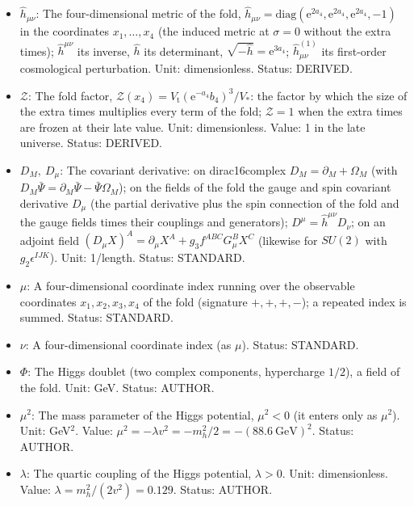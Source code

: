 \documentclass[
  10pt,
]{article}
\providecommand{\tightlist}{%
  \setlength{\itemsep}{0pt}\setlength{\parskip}{0pt}}
\begin{document}
\begin{itemize}
\tightlist
\item
  \(\hat h_{\mu\nu}\): The four-dimensional metric of the fold,
  \(\hat h_{\mu\nu} = \mathrm{diag}(\mathrm{e}^{2a_4}, \mathrm{e}^{2a_4}, \mathrm{e}^{2a_4}, -1)\)
  in the coordinates \(x_1, \dots, x_4\) (the induced metric at
  \(\sigma = 0\) without the extra times); \(\hat h^{\mu\nu}\) its
  inverse, \(\hat h\) its determinant,
  \(\sqrt{-\hat h} = \mathrm{e}^{3a_4}\); \(\hat h^{(1)}_{\mu\nu}\) its
  first-order cosmological perturbation. Unit: dimensionless. Status:
  DERIVED.
\item
  \(\mathcal{Z}\): The fold factor,
  \(\mathcal{Z}(x_4) = V_{\mathrm{t}}(\mathrm{e}^{-a_4}b_4)^3/V_*\): the
  factor by which the size of the extra times multiplies every term of
  the fold; \(\mathcal{Z} = 1\) when the extra times are frozen at their
  late value. Unit: dimensionless. Value: 1 in the late universe.
  Status: DERIVED.
\item
  \(D_M,\ D_\mu\): The covariant derivative: on dirac16complex
  \(D_M = \partial_M + \Omega_M\) (with
  \(D_M\bar\Psi = \partial_M\bar\Psi - \bar\Psi\Omega_M\)); on the
  fields of the fold the gauge and spin covariant derivative \(D_\mu\)
  (the partial derivative plus the spin connection of the fold and the
  gauge fields times their couplings and generators);
  \(D^\mu = \hat h^{\mu\nu}D_\nu\); on an adjoint field
  \((D_\mu X)^A = \partial_\mu X^A + g_3f^{ABC}G^B_\mu X^C\) (likewise
  for \(SU(2)\) with \(g_2\epsilon^{IJK}\)). Unit: 1/length. Status:
  STANDARD.
\item
  \(\mu\): A four-dimensional coordinate index running over the
  observable coordinates \(x_1, x_2, x_3, x_4\) of the fold (signature
  \(+,+,+,-\)); a repeated index is summed. Status: STANDARD.
\item
  \(\nu\): A four-dimensional coordinate index (as \(\mu\)). Status:
  STANDARD.
\item
  \(\Phi\): The Higgs doublet (two complex components, hypercharge
  \(1/2\)), a field of the fold. Unit: GeV. Status: AUTHOR.
\item
  \(\mu^2\): The mass parameter of the Higgs potential, \(\mu^2 < 0\)
  (it enters only as \(\mu^2\)). Unit: GeV\(^2\). Value:
  \(\mu^2 = -\lambda v^2 = -m_h^2/2 = -(88.6\ \mathrm{GeV})^2\). Status:
  AUTHOR.
\item
  \(\lambda\): The quartic coupling of the Higgs potential,
  \(\lambda > 0\). Unit: dimensionless. Value:
  \(\lambda = m_h^2/(2v^2) = 0.129\). Status: AUTHOR.

\end{itemize}
\end{document}
